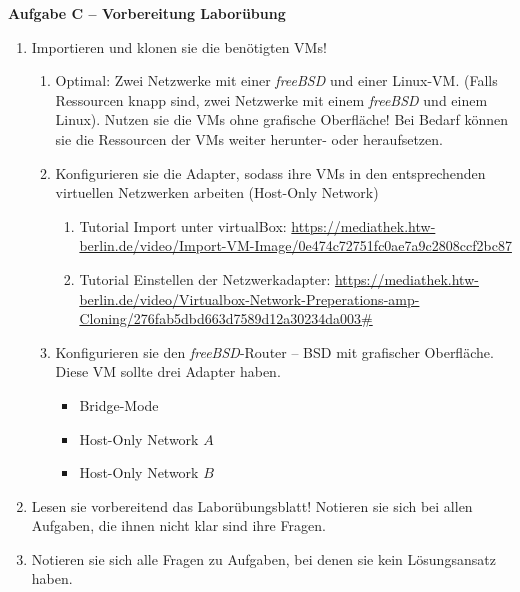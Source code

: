 \documentclass[paper=a4,fontsize=11pt]{scrartcl}%
\numberwithin{equation}{section}
\begin{document}
\begin{center}
\Large{\textbf{Aufgabe C -- Vorbereitung Laborübung}}
\end{center}
\vskip0.25in
\begin{enumerate}
	\item Importieren und klonen sie die benötigten VMs!
	\begin{enumerate}
		\item Optimal: Zwei Netzwerke mit einer \emph{freeBSD} und einer Linux-VM. (Falls Ressourcen knapp sind, zwei Netzwerke mit einem \emph{freeBSD} und einem Linux). Nutzen sie die VMs ohne grafische Oberfläche! Bei Bedarf können sie die Ressourcen der VMs weiter herunter- oder heraufsetzen.
		\item Konfigurieren sie die Adapter, sodass ihre VMs in den entsprechenden virtuellen Netzwerken arbeiten (Host-Only Network)
		\begin{enumerate}
			\item Tutorial Import unter virtualBox: \url{https://mediathek.htw-berlin.de/video/Import-VM-Image/0e474c72751fc0ae7a9c2808ccf2bc87}
			\item Tutorial Einstellen der Netzwerkadapter: \url{https://mediathek.htw-berlin.de/video/Virtualbox-Network-Preperations-amp-Cloning/276fab5dbd663d7589d12a30234da003#}
		\end{enumerate}
		\item Konfigurieren sie den \emph{freeBSD}-Router -- BSD mit grafischer Oberfläche. Diese VM sollte drei Adapter haben. 
		\begin{itemize}
			\item Bridge-Mode
			\item Host-Only Network $A$
			\item Host-Only Network $B$
		\end{itemize}
	\end{enumerate}
	\item Lesen sie vorbereitend das Laborübungsblatt! Notieren sie sich bei allen Aufgaben, die ihnen nicht klar sind ihre Fragen. 
	\item Notieren sie sich alle Fragen zu Aufgaben, bei denen sie kein Lösungsansatz haben.
\end{enumerate}

\printbibliography
\end{document}
